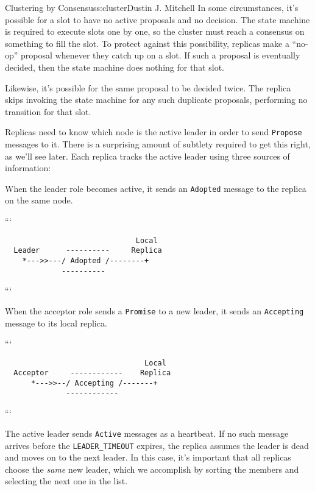 \begin{aosachapter}{Clustering by Consensus}{s:cluster}{Dustin J. Mitchell}
In some circumstances, it's possible for a slot to have no active
proposals and no decision. The state machine is required to execute
slots one by one, so the cluster must reach a consensus on something to
fill the slot. To protect against this possibility, replicas make a
``no-op'' proposal whenever they catch up on a slot. If such a proposal
is eventually decided, then the state machine does nothing for that
slot.

Likewise, it's possible for the same proposal to be decided twice. The
replica skips invoking the state machine for any such duplicate
proposals, performing no transition for that slot.

Replicas need to know which node is the active leader in order to send
\texttt{Propose} messages to it. There is a surprising amount of
subtlety required to get this right, as we'll see later. Each replica
tracks the active leader using three sources of information:

\begin{aosaitemize}

\item
  When the leader role becomes active, it sends an \texttt{Adopted}
  message to the replica on the same node.
\end{aosaitemize}

```

\begin{verbatim}
                              Local 
  Leader      ----------     Replica
    *--->>---/ Adopted /--------+
             ----------
\end{verbatim}

```

\begin{aosaitemize}

\item
  When the acceptor role sends a \texttt{Promise} to a new leader, it
  sends an \texttt{Accepting} message to its local replica.
\end{aosaitemize}

```

\begin{verbatim}
                                Local 
  Acceptor     ------------    Replica
      *--->>--/ Accepting /-------+
              ------------
\end{verbatim}

```

\begin{aosaitemize}

\item
  The active leader sends \texttt{Active} messages as a heartbeat. If no
  such message arrives before the \texttt{LEADER\_TIMEOUT} expires, the
  replica assumes the leader is dead and moves on to the next leader. In
  this case, it's important that all replicas choose the \emph{same} new
  leader, which we accomplish by sorting the members and selecting the
  next one in the list.
\end{aosaitemize}


\end{aosachapter}
